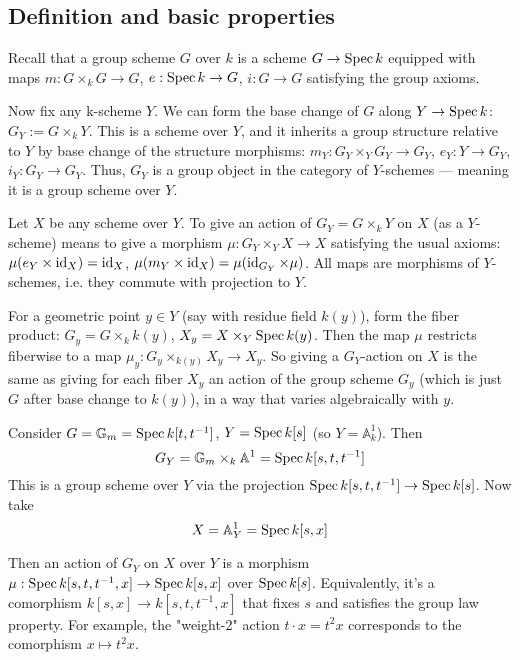 \documentclass[12pt]{article}
\begin{document}
\subsection{Definition and basic properties}

Recall that a group scheme $G$ over $k$ is a scheme $G \to \operatorname{Spec} k$ equipped with maps $m : G \times_k G \to G$, $e : \operatorname{Spec} k \to G$, $i : G \to G$ satisfying the group axioms.

Now fix any k-scheme $Y$. We can form the base change of $G$ along $Y \to \operatorname{Spec} k$: $G_Y := G \times_k Y$. This is a scheme over $Y$, and it inherits a group structure relative to $Y$ by base change of the structure morphisms: $m_Y : G_Y \times_Y G_Y \to G_Y$, $e_Y : Y \to G_Y$, $i_Y : G_Y \to G_Y$. Thus, $G_Y$ is a group object in the category of $Y$-schemes — meaning it is a group scheme over $Y$.

Let $X$ be any scheme over $Y$. To give an action of $G_Y = G \times_k Y$ on $X$ (as a $Y$-scheme) means to give a morphism $\mu : G_Y \times_Y X \to X$ satisfying the usual axioms: $\mu(e_Y \times \operatorname{id}_X) = \operatorname{id}_X$, $\mu(m_Y \times \operatorname{id}_X) = \mu(\operatorname{id}_{G_Y} \times \mu)$. All maps are morphisms of $Y$-schemes, i.e. they commute with projection to $Y$.

For a geometric point $y \in Y$ (say with residue field $k(y)$), form the fiber product: $G_y = G \times_k k(y)$, $X_y = X \times_Y \operatorname{Spec} k(y)$. Then the map $\mu$ restricts fiberwise to a map $\mu_y : G_y \times_{k(y)} X_y \to X_y$. So giving a $G_Y$-action on $X$ is the same as giving for each fiber $X_y$ an action of the group scheme $G_y$ (which is just $G$ after base change to $k(y)$), in a way that varies algebraically with $y$.



\begin{example}
   Consider $G = \mathbb{G}_m = \operatorname{Spec} k[t, t^{-1}]$, $Y = \operatorname{Spec} k[s]$ (so $Y = \mathbb{A}^1_k$). Then \[G_Y = \mathbb{G}_m \times_k \mathbb{A}^1 = \operatorname{Spec} k[s,t,t^{-1}]\] This is a group scheme over $Y$ via the projection $\operatorname{Spec} k[s,t,t^{-1}] \to \operatorname{Spec} k[s]$. Now take \[X = \mathbb{A}^1_Y = \operatorname{Spec} k[s,x]\]

   Then an action of $G_Y$ on $X$ over $Y$ is a morphism $\mu : \operatorname{Spec} k[s,t,t^{-1},x] \to \operatorname{Spec} k[s,x]$ over $\operatorname{Spec} k[s]$. Equivalently, it's a comorphism $k[s,x] \to k[s,t,t^{-1},x]$ that fixes $s$ and satisfies the group law property. For example, the "weight-2" action $t \cdot x = t^2 x$ corresponds to the comorphism $x \mapsto t^2 x$.
\end{example} 
\end{document}
